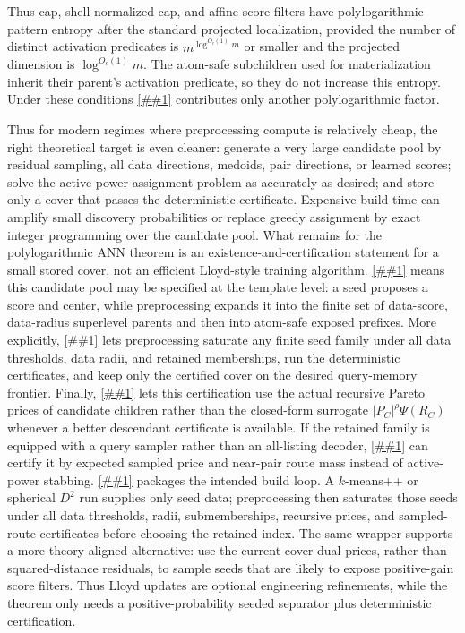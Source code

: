 \documentclass[10pt]{article}
\newcommand{\cref}[1]{\ref{##1}}
\newcommand{\Cref}[1]{\ref{##1}}
\theoremstyle{definition}
\begin{document}
Thus cap, shell-normalized cap, and affine score filters have polylogarithmic
pattern entropy after the standard projected localization, provided the number
of distinct activation predicates is $m^{\log^{O_c(1)}m}$ or smaller and the
projected dimension is $\log^{O_c(1)}m$.  The atom-safe subchildren used for
materialization inherit their parent's activation predicate, so they do not
increase this entropy.  Under these conditions \cref{lem:pattern-complete-cover}
contributes only another polylogarithmic factor.

Thus for modern regimes where preprocessing compute is relatively cheap, the
right theoretical target is even cleaner: generate a very large candidate pool
by residual sampling, all data directions, medoids, pair directions, or learned
scores; solve the active-power assignment problem as accurately as desired; and
store only a cover that passes the deterministic certificate.  Expensive build
time can amplify small discovery probabilities or replace greedy assignment by
exact integer programming over the candidate pool.  What remains for the
polylogarithmic ANN theorem is an existence-and-certification statement for a
small stored cover, not an efficient Lloyd-style training algorithm.
\Cref{lem:center-score-closure} means this candidate pool may be specified at
the template level: a seed proposes a score and center, while preprocessing
expands it into the finite set of data-score, data-radius superlevel parents
and then into atom-safe exposed prefixes.  More explicitly,
\cref{cor:offline-center-score-saturation} lets preprocessing saturate any
finite seed family under all data thresholds, data radii, and retained
memberships, run the deterministic certificates, and keep only the certified
cover on the desired query-memory frontier.  Finally,
\cref{cor:offline-recursive-pareto-pricing} lets this certification use the
actual recursive Pareto prices of candidate children rather than the closed-form
surrogate $|P_C|^\rho\Psi(R_C)$ whenever a better descendant certificate is
available.  If the retained family is equipped with a query sampler rather than
an all-listing decoder, \cref{lem:sampled-priced-cover} can certify it by
expected sampled price and near-pair route mass instead of active-power
stabbing.
\Cref{cor:seed-saturate-certify} packages the intended build loop.  A
$k$-means++ or spherical \(D^2\) run supplies only seed data; preprocessing then
saturates those seeds under all data thresholds, radii, submemberships,
recursive prices, and sampled-route certificates before choosing the retained
index.  The same wrapper supports a more theory-aligned alternative: use the
current cover dual prices, rather than squared-distance residuals, to sample
seeds that are likely to expose positive-gain score filters.  Thus Lloyd
updates are optional engineering refinements, while the theorem only needs a
positive-probability seeded separator plus deterministic certification.
\end{document}
